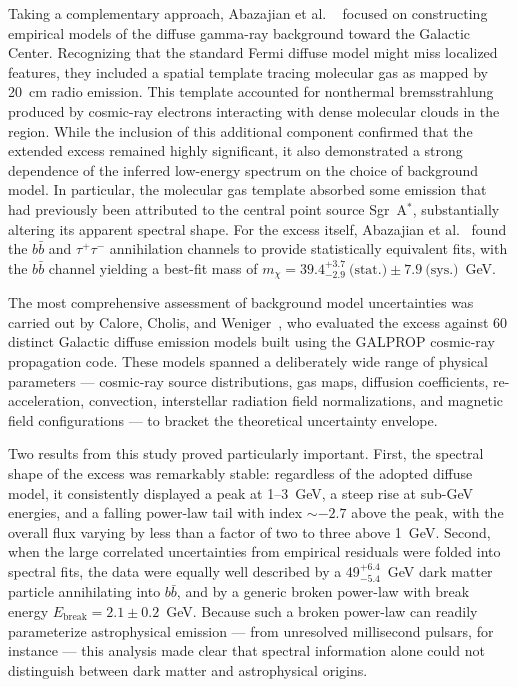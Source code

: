 Taking a complementary approach, Abazajian et al.
\ \cite{Abazajian:2014fta} focused on constructing empirical models of the diffuse gamma-ray background toward the Galactic Center.
Recognizing that the standard Fermi diffuse model might miss localized features, they included a spatial template tracing molecular gas as mapped by 20~cm radio emission.
This template accounted for nonthermal bremsstrahlung produced by cosmic-ray electrons interacting with dense molecular clouds in the region.
While the inclusion of this additional component confirmed that the extended excess remained highly significant, it also demonstrated a strong dependence of the inferred low-energy spectrum on the choice of background model.
In particular, the molecular gas template absorbed some emission that had previously been attributed to the central point source Sgr~A$^*$, substantially altering its apparent spectral shape.
For the excess itself, Abazajian et al.
\ found the $b\bar{b}$ and $\tau^+\tau^-$ annihilation channels to provide statistically equivalent fits, with the $b\bar{b}$ channel yielding a best-fit mass of $m_\chi = 39.4^{+3.7}_{-2.9}~\text{(stat.)} \pm 7.9~\text{(sys.)}$~GeV.

The most comprehensive assessment of background model uncertainties was carried out by Calore, Cholis, and Weniger~\cite{Calore:2014xka}, who evaluated the excess against 60 distinct Galactic diffuse emission models built using the GALPROP cosmic-ray propagation code.
These models spanned a deliberately wide range of physical parameters --- cosmic-ray source distributions, gas maps, diffusion coefficients, re-acceleration, convection, interstellar radiation field normalizations, and magnetic field configurations --- to bracket the theoretical uncertainty envelope.

Two results from this study proved particularly important.
First, the spectral shape of the excess was remarkably stable: regardless of the adopted diffuse model, it consistently displayed a peak at 1--3~GeV, a steep rise at sub-GeV energies, and a falling power-law tail with index $\sim -2.7$ above the peak, with the overall flux varying by less than a factor of two to three above 1~GeV.
Second, when the large correlated uncertainties from empirical residuals were folded into spectral fits, the data were equally well described by a 49$^{+6.4}_{-5.4}$~GeV dark matter particle annihilating into $b\bar{b}$, and by a generic broken power-law with break energy $E_\text{break} = 2.1 \pm 0.2$~GeV.
Because such a broken power-law can readily parameterize astrophysical emission --- from unresolved millisecond pulsars, for instance --- this analysis made clear that spectral information alone could not distinguish between dark matter and astrophysical origins.

